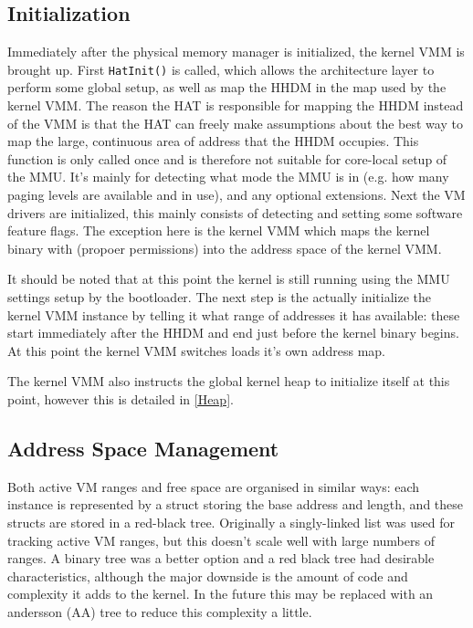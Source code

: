 \subsection{Initialization}
Immediately after the physical memory manager is initialized, the kernel VMM is brought up. First \verb|HatInit()| is called, which allows the architecture layer to perform some global setup, as well as map the HHDM in the map used by the kernel VMM. The reason the HAT is responsible for mapping the HHDM instead of the VMM is that the HAT can freely make assumptions about the best way to map the large, continuous area of address that the HHDM occupies. This function is only called once and is therefore not suitable for core-local setup of the MMU. It's mainly for detecting what mode the MMU is in (e.g. how many paging levels are available and in use), and any optional extensions. Next the VM drivers are initialized, this mainly consists of detecting and setting some software feature flags. The exception here is the kernel VMM which maps the kernel binary with (propoer permissions) into the address space of the kernel VMM.

It should be noted that at this point the kernel is still running using the MMU settings setup by the bootloader. The next step is the actually initialize the kernel VMM instance by telling it what range of addresses it has available: these start immediately after the HHDM and end just before the kernel binary begins. At this point the kernel VMM switches loads it's own address map.

The kernel VMM also instructs the global kernel heap to initialize itself at this point, however this is detailed in \autoref{Heap}.

\subsection{Address Space Management}
Both active VM ranges and free space are organised in similar ways: each instance is represented by a struct storing the base address and length, and these structs are stored in a red-black tree. Originally a singly-linked list was used for tracking active VM ranges, but this doesn't scale well with large numbers of ranges. A binary tree was a better option and a red black tree had desirable characteristics, although the major downside is the amount of code and complexity it adds to the kernel. In the future this may be replaced with an andersson (AA) tree to reduce this complexity a little.

